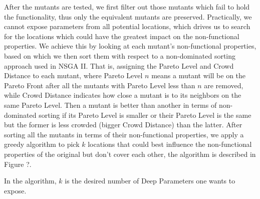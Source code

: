 After the mutants are tested, we first filter out those mutants which fail to hold the functionality, thus only the equivalent mutants are preserved. Practically, we cannot expose parameters from all potential locations, which drives us to search for the locations which could have the greatest impact on the non-functional properties. We achieve this by looking at each mutant's non-functional properties, based on which we then sort them with respect to a non-dominated sorting approach used in NSGA II\cite{}. That is, assigning the Pareto Level and Crowd Distance to each mutant, where Pareto Level $n$ means a mutant will be on the Pareto Front after all the mutants with Pareto Level less than $n$ are removed, while Crowd Distance indicates how close a mutant is to its neighbors on the same Pareto Level. Then a mutant is better than another in terms of non-dominated sorting if its Pareto Level is smaller or their Pareto Level is the same but the former is less crowded (bigger Crowd Distance) than the latter. After sorting all the mutants in terms of their non-functional properties, we apply a greedy algorithm to pick $k$ locations that could best influence the non-functional properties of the original but don't cover each other, the algorithm is described in Figure ?.


In the algorithm, $k$ is the desired number of Deep Parameters one wants to expose. 

%
%
%
%
%
%
%
%
%

